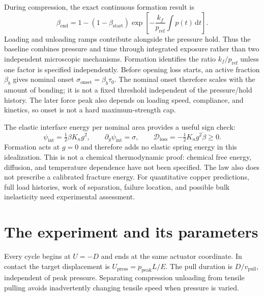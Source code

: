 \documentclass[11pt,a4paper]{article}
\newcommand{\dd}{\mathrm{d}}
\begin{document}
During compression, the exact continuous formation result is
\begin{equation}
 \beta_{\mathrm{end}}=1-(1-\beta_{\mathrm{start}})
 \exp\left[-\frac{k_f}{p_{\mathrm{ref}}}\int p(t)\,\dd t\right].
 \label{eq:dose}
\end{equation}
Loading and unloading ramps contribute alongside the pressure hold. Thus the
baseline combines pressure and time through integrated exposure rather than
two independent microscopic mechanisms. Formation identifies the ratio
$k_f/p_{\mathrm{ref}}$ unless one factor is specified independently.
Before opening loss starts, an active fraction $\beta_b$ gives nominal onset
$\sigma_{\mathrm{onset}}=\beta_b\tau_0$. The nominal onset therefore scales
with the amount of bonding; it is not a fixed threshold independent of the
pressure/hold history. The later force peak also depends on loading speed,
compliance, and kinetics, so onset is not a hard maximum-strength cap.

The elastic interface energy per nominal area provides a useful sign check:
\begin{equation}
 \psi_{\mathrm{int}}=\tfrac12\beta K_ng^2,\qquad
 \partial_g\psi_{\mathrm{int}}=\sigma,\qquad
 \mathcal D_{\mathrm{loss}}=-\tfrac12K_ng^2\dot\beta\geq0.
\end{equation}
Formation acts at $g=0$ and therefore adds no elastic spring energy in this
idealization. This is not a chemical thermodynamic proof: chemical free energy,
diffusion, and temperature dependence have not been specified. The law also
does not prescribe a calibrated fracture energy. For quantitative copper
predictions, full load histories, work of separation, failure location, and
possible bulk inelasticity need experimental assessment.

\section{The experiment and its parameters}

Every cycle begins at $U=-D$ and ends at the same actuator coordinate. In
contact the target displacement is $U_{\mathrm{press}}=p_{\mathrm{peak}}L/E$.
The pull duration is $D/v_{\mathrm{pull}}$, independent of peak pressure.
Separating compression unloading from tensile pulling avoids inadvertently
changing tensile speed when pressure is varied.
\end{document}

